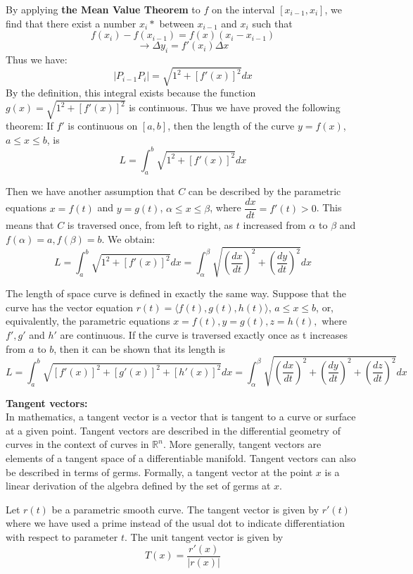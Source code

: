By applying \textbf{the Mean Value Theorem} to $f$ on the interval $[x_{i-1},x_i]$, we find that there exist a number $x_i*$ between $x_{i-1}$ and $x_i$ such that
$$ f(x_i)-f(x_{i-1})=f(x)(x_i-x_{i-1})$$
$$ \rightarrow \Delta y_i = f'(x_i)\Delta x $$
Thus we have:
$$ \left| P_{i-1} P_i \right| = \sqrt{1^2 + [f'(x)]^2} dx $$
By the definition, this integral exists because the function $g(x) = \sqrt{1^2 + [f'(x)]^2}$ is continuous. Thus we have proved the following theorem:
If $f'$ is continuous on $[a,b]$, then the length of the curve $y=f(x)$, $a \leq x \leq b$, is
$$ L = \int_{a}^{b} \sqrt{1^2 + \left[f'(x)\right]^2} dx  $$

Then we have another assumption that $C$ can be described by the parametric equations $x=f(t)$ and $y=g(t)$, $\alpha \leq x \leq \beta$, where \vspace{0.2cm} $\dfrac{dx}{dt}=f'(t)>0$. This means that $C$ is traversed once, from left to right, as $t$ increased from $\alpha$ to $\beta$ and $f(\alpha)=a, f(\beta)=b$. We obtain:
$$ L = \int_{a}^{b} \sqrt{1^2 + \left[f'(x)\right]^2} dx = \int_{\alpha}^{\beta} \sqrt{\left(\dfrac{dx}{dt}\right)^2 + \left(\dfrac{dy}{dt}\right)^2} dx  $$

The length of space curve is defined in exactly the same way. Suppose that the curve has the vector equation $r(t)=\langle f(t), g(t), h(t) \rangle$, $a\leq x\leq b$, or, equivalently, the parametric equations $x=f(t), y=g(t), z=h(t),$ where $f',g'$ and $h'$ are continuous. If the curve is traversed exactly once as t increases from $a$ to $b$, then it can be shown that its length is
$$ L = \int_{a}^{b} \sqrt{\left[f'(x)\right]^2 + \left[g'(x)\right]^2 + \left[h'(x)\right]^2} dx = \int_{\alpha}^{\beta} \sqrt{\left(\dfrac{dx}{dt}\right)^2 + \left(\dfrac{dy}{dt}\right)^2 + \left(\dfrac{dz}{dt}\right)^2} dx  $$

\vspace*{0.5cm}

\textbf{Tangent vectors: }\\
In mathematics, a tangent vector is a vector that is tangent to a curve or surface at a given point. Tangent vectors are described in the differential geometry of curves in the context of curves in $\mathbb{R}^n$. More generally, tangent vectors are elements of a tangent space of a differentiable manifold. Tangent vectors can also be described in terms of germs. Formally, a tangent vector at the point $x$ is a linear derivation of the algebra defined by the set of germs at $x$.

Let $r(t)$ be a parametric smooth curve. The tangent vector is given by $r'(t)$ where we have used a prime instead of the usual dot to indicate differentiation with respect to parameter $t$. The unit tangent vector is given by
$$ T(x) = \dfrac{r'(x)}{\lvert r(x) \rvert} $$

